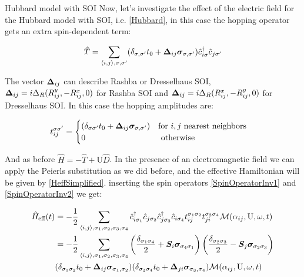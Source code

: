 \begin{section}{Hubbard model with SOI}
\label{Section3HubbardSOI}
Now, let's investigate the effect of the electric field for the Hubbard model with SOI, i.e. \ref{Hubbard}, in this case the hopping operator gets an extra spin-dependent term:

\begin{equation}
\hat{T} = \sum_{\langle i,j \rangle, \sigma, \sigma'}(\delta_{\sigma, \sigma'} t_0 + \boldsymbol{\Delta}_{ij} \boldsymbol{\sigma}_{\sigma, \sigma'})\hat{c}_{i \sigma}^\dagger \hat{c}_{j \sigma'}
\end{equation}

The vector $\boldsymbol{\Delta}_{ij}$ can describe Rashba or Dresselhaus SOI, $\boldsymbol{\Delta}_{ij} = i\Delta_R(R_{ij}^y, -R_{ij}^x, 0)$ for Rashba SOI and $\boldsymbol{\Delta}_{ij} = i\Delta_R(R_{ij}^x, -R_{ij}^y, 0)$ for Dresselhaus SOI. 
In this case the hopping amplitudes are:

\begin{equation}
\label{HoppHubbSOI}
t_{ij}^{\sigma \sigma'} = \begin{cases}
	(\delta_{\sigma \sigma'}t_0+\boldsymbol{\Delta}_{ij} \boldsymbol{\sigma}_{\sigma, \sigma'}) & \text{for } i, j \text{ nearest neighbors} \\
	0 & \text{ otherwise}
\end{cases} \quad
\end{equation}
 
And as before $\hat{H} = -\hat{T} + \text{U}\hat{D}$. In the presence of an electromagnetic field we can apply the Peierls substitution as we did before, and the effective Hamiltonian will be given by \ref{HeffSimplified}.  inserting the spin operators \ref{SpinOperatorInv1} and \ref{SpinOperatorInv2} we get:

\begin{align}
\hat{H}_{\text{eff}}(t) &= - \frac{1}{2} \sum_{\langle i,j \rangle, \sigma_1, \sigma_2, \sigma_3, \sigma_4}\hat{c}_{i \sigma_1}^\dagger \hat{c}_{j \sigma_2} \hat{c}_{j \sigma_3}^\dagger \hat{c}_{i \sigma_4} t_{ij}^{\sigma_1 \sigma_2} t_{ji}^{\sigma_3 \sigma_4} \mathcal{M}(\alpha_{ij}, \text{U}, \omega, t) \nonumber \\
&= - \frac{1}{2} \sum_{\langle i,j \rangle, \sigma_1, \sigma_2, \sigma_3, \sigma_4} \left( \frac{\delta_{\sigma_1 \sigma_4}}{2} + \boldsymbol{S}_i\boldsymbol{\sigma}_{\sigma_4 \sigma_1} \right) \left( \frac{\delta_{\sigma_2 \sigma_3}}{2} - \boldsymbol{S}_j\boldsymbol{\sigma}_{\sigma_2 \sigma_3} \right) \nonumber \\ &(\delta_{\sigma_1 \sigma_2}t_0+\boldsymbol{\Delta}_{ij} \boldsymbol{\sigma}_{\sigma_1, \sigma_2}) (\delta_{\sigma_3 \sigma_4}t_0+\boldsymbol{\Delta}_{ji} \boldsymbol{\sigma}_{\sigma_3, \sigma_4}) \mathcal{M}(\alpha_{ij}, \text{U}, \omega, t) \label{HeffHubbSOI1}
\end{align}


\end{section}

